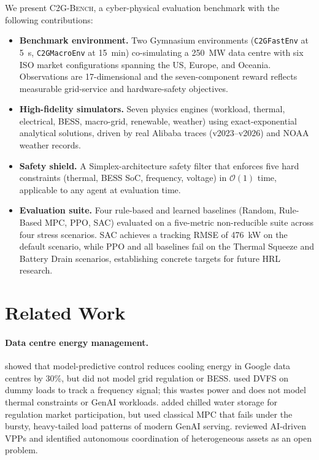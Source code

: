 \documentclass{article}
\newcommand{\cname}{\textsc{C2G-Bench}}
\newcommand{\envlow}{\texttt{C2GFastEnv}}
\newcommand{\envhigh}{\texttt{C2GMacroEnv}}
\begin{document}
We present \cname{}, a cyber-physical evaluation benchmark with the following
contributions:
\begin{itemize}[leftmargin=*, itemsep=0pt]
  \item \textbf{Benchmark environment.}
        Two Gymnasium environments (\envlow{} at 5~s, \envhigh{} at 15~min)
        co-simulating a 250~MW data centre with six ISO market configurations
        spanning the US, Europe, and Oceania.
        Observations are 17-dimensional and the seven-component reward
        reflects measurable grid-service and hardware-safety objectives.
  \item \textbf{High-fidelity simulators.}
        Seven physics engines (workload, thermal, electrical, BESS, macro-grid,
        renewable, weather) using exact-exponential analytical solutions,
        driven by real Alibaba traces (v2023--v2026) and NOAA weather records.
  \item \textbf{Safety shield.}
        A Simplex-architecture safety filter that enforces five hard
        constraints (thermal, BESS SoC, frequency, voltage) in $\mathcal{O}(1)$
        time, applicable to any agent at evaluation time.
  \item \textbf{Evaluation suite.}
        Four rule-based and learned baselines (Random, Rule-Based MPC, PPO, SAC)
        evaluated on a five-metric non-reducible suite across four stress
        scenarios.
        SAC achieves a tracking RMSE of 476~kW on the default scenario, while
        PPO and all baselines fail on the Thermal Squeeze and
        Battery Drain scenarios, establishing concrete targets for future
        HRL research.
\end{itemize}

\section{Related Work}
\label{sec:related}

\paragraph{Data centre energy management.}
\citet{lazic2018dc} showed that model-predictive control reduces cooling energy
in Google data centres by 30\%, but did not model grid regulation or BESS.
\citet{wang2019frequency} used DVFS on dummy loads to track a frequency signal;
this wastes power and does not model thermal constraints or GenAI workloads.
\citet{fu2021multistage} added chilled water storage for regulation market
participation, but used classical MPC that fails under the bursty, heavy-tailed
load patterns of modern GenAI serving.
\citet{li2026aivpp} reviewed AI-driven VPPs and identified autonomous
coordination of heterogeneous assets as an open problem.
\end{document}
